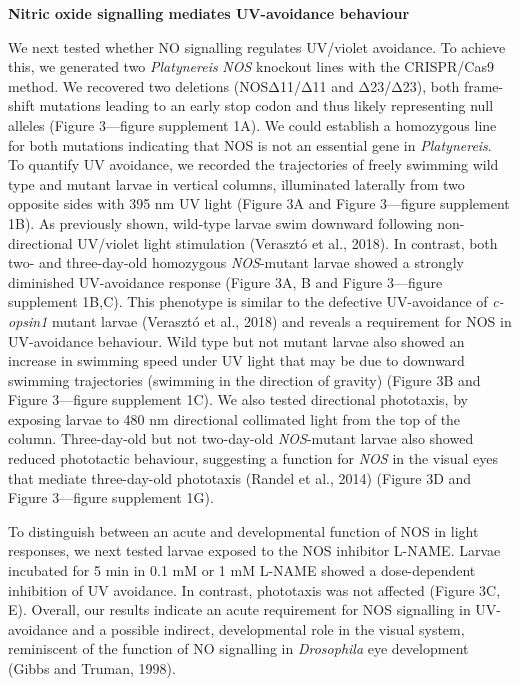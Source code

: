 \documentclass[
  10pt,
  onecolumn]{article}
\begin{document}
\textbf{Nitric oxide signalling mediates UV-avoidance behaviour}

We next tested whether NO signalling regulates UV/violet avoidance. To
achieve this, we generated two \emph{Platynereis} \emph{NOS} knockout
lines with the CRISPR/Cas9 method. We recovered two deletions
(NOSΔ11/Δ11 and Δ23/Δ23), both frame-shift mutations leading to an early
stop codon and thus likely representing null alleles (Figure 3---figure
supplement 1A). We could establish a homozygous line for both mutations
indicating that NOS is not an essential gene in \emph{Platynereis}. To
quantify UV avoidance, we recorded the trajectories of freely swimming
wild type and mutant larvae in vertical columns, illuminated laterally
from two opposite sides with 395 nm UV light (Figure 3A and Figure
3---figure supplement 1B). As previously shown, wild-type larvae swim
downward following non-directional UV/violet light stimulation (Verasztó
et al., 2018). In contrast, both two- and three-day-old homozygous
\emph{NOS}-mutant larvae showed a strongly diminished UV-avoidance
response (Figure 3A, B and Figure 3---figure supplement 1B,C). This
phenotype is similar to the defective UV-avoidance of \emph{c-opsin1}
mutant larvae (Verasztó et al., 2018) and reveals a requirement for NOS
in UV-avoidance behaviour. Wild type but not mutant larvae also showed
an increase in swimming speed under UV light that may be due to downward
swimming trajectories (swimming in the direction of gravity) (Figure 3B
and Figure 3---figure supplement 1C). We also tested directional
phototaxis, by exposing larvae to 480 nm directional collimated light
from the top of the column. Three-day-old but not two-day-old
\emph{NOS}-mutant larvae also showed reduced phototactic behaviour,
suggesting a function for \emph{NOS} in the visual eyes that mediate
three-day-old phototaxis (Randel et al., 2014) (Figure 3D and Figure
3---figure supplement 1G).

To distinguish between an acute and developmental function of NOS in
light responses, we next tested larvae exposed to the NOS inhibitor
L-NAME. Larvae incubated for 5 min in 0.1 mM or 1 mM L-NAME showed a
dose-dependent inhibition of UV avoidance. In contrast, phototaxis was
not affected (Figure 3C, E). Overall, our results indicate an acute
requirement for NOS signalling in UV-avoidance and a possible indirect,
developmental role in the visual system, reminiscent of the function of
NO signalling in \emph{Drosophila} eye development (Gibbs and Truman,
1998).
\end{document}
